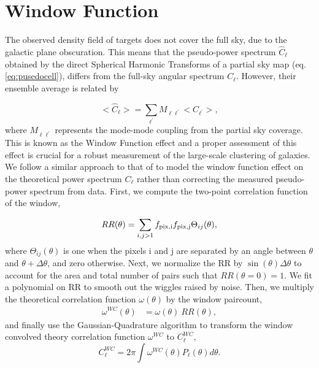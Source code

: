 %
%
\section{Window Function}\label{app:windowfunction}
The observed density field of targets does not cover the full sky, due to the galactic plane obscuration. This means that the pseudo-power spectrum $\hat{C}_{\ell}$ obtained by the direct Spherical Harmonic Transforms of a partial sky map (eq. \ref{eq:pusedocell}), differs from the full-sky angular spectrum $C_{\ell}$. However, their ensemble average is related by \citep{hivonmaster2002ApJ...567....2H, poker2011A&A...535A..90P} 

\begin{equation}
    <\hat{C}_{\ell}> = \sum_{\ell^{\prime}} M_{\ell \ell^{\prime}}<C_{\ell^{\prime}}>,
\end{equation}
where $M_{\ell \ell^{\prime}}$ represents the mode-mode coupling from the partial sky coverage. This is known as the Window Function effect and a proper assessment of this effect is crucial for a robust measurement of the large-scale clustering of galaxies. We follow a similar approach to that of \citep{szapudi2001ApJ...548L.115S, chon2004MNRAS.350..914C} to model the window function effect on the theoretical power spectrum $C_{\ell}$ rather than correcting the measured pseudo-power spectrum from data. First, we compute the two-point correlation function of the window,

\begin{equation}
    RR(\theta) = \sum_{i,j>1} f_{\rm pix, i} f_{\rm pix, j} \Theta_{ij}(\theta),
\end{equation}
where $\Theta_{ij}(\theta)$ is one when the pixels i and j are separated by an angle between $\theta$ and $\theta + \Delta\theta$, and zero otherwise. Next, we normalize the RR by $\sin(\theta)\Delta\theta$ to account for the area and total number of pairs such that $RR(\theta=0)=1$. We fit a polynomial on RR to smooth out the wiggles raised by noise. Then, we multiply the theoretical correlation function $\omega(\theta)$ by the window paircount,
\begin{align}
    \omega^{WC}(\theta) &= \omega(\theta)~RR(\theta),
\end{align}
and finally use the Gaussian-Quadrature algorithm to transform the window convolved theory correlation function $\omega^{WC}$ to $C^{WC}_{\ell}$,
\begin{equation}
    C^{WC}_{\ell} = 2\pi \int \omega^{WC}(\theta)P_{\ell}(\theta)d\theta.
\end{equation}


